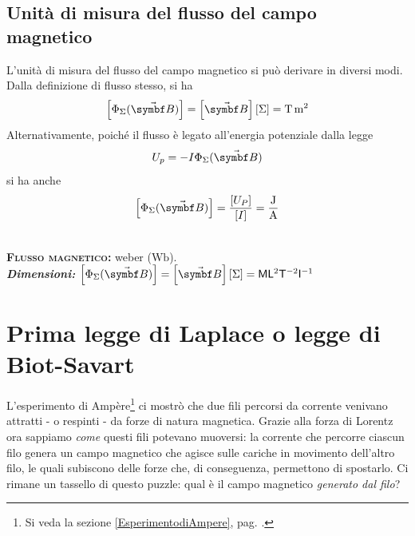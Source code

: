 \subsection{Unità di misura del flusso del campo magnetico}
L'unità di misura del flusso del campo magnetico si può derivare in diversi modi. Dalla definizione di flusso stesso, si ha
\begin{equation*}
	\left[\Phi_{\Sigma}(\vba{B})\right]=\left[\vba{B}\right]\left[\Sigma\right]=\unit[per-mode = fraction,exponent-product=\ensuremath{\cdot}]{\tesla\meter\squared}
\end{equation*}
Alternativamente, poiché il flusso è legato all'energia potenziale dalla legge
\begin{equation*}
	U_p=-I\Phi_{\Sigma}(\vba{B})
\end{equation*}
si ha anche
\begin{equation*}
	\left[\Phi_{\Sigma}(\vba{B})\right]=\frac{\left[U_P\right]}{\left[I\right]}=\unit[per-mode = fraction,exponent-product=\ensuremath{\cdot}]{\joule\per\ampere}
\end{equation*}
\begin{units}~\\
	\textbf{\textsc{Flusso magnetico:}} weber ($\unit{\weber}$).\\
	\textit{\textbf{Dimensioni:}} $\left[\Phi_{\Sigma}(\vba{B})\right]=\left[\vba{B}\right]\left[\Sigma\right]=\mathsf{M}\mathsf{L}^2 \mathsf{T}^{-2}  \mathsf{I}^{-1}$
\end{units}
\section{Prima legge di Laplace o legge di Biot-Savart}
L'esperimento di Ampère\footnote{Si veda la sezione \ref{EsperimentodiAmpere}, pag. \pageref{EsperimentodiAmpere}.} ci mostrò che due fili percorsi da corrente venivano attratti - o respinti - da forze di natura magnetica. Grazie alla forza di Lorentz ora sappiamo \textit{come} questi fili potevano muoversi: la corrente che percorre ciascun filo genera un campo magnetico che agisce sulle cariche in movimento dell'altro filo, le quali subiscono delle forze che, di conseguenza, permettono di spostarlo. Ci rimane un tassello di questo puzzle: qual è il campo magnetico \textit{generato dal filo}?

